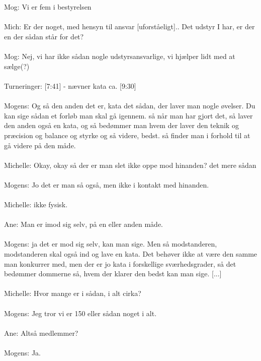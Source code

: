 \\\\
Mog: Vi er fem i bestyrelsen
\\\\
Mich: Er der noget, med hensyn til ansvar [uforståeligt].. 
Det udstyr I har, er der en der sådan står for det?
\\\\
Mog: Nej, vi har ikke sådan nogle udstyrsansvarlige, vi hjælper lidt med at sælge(?) 
\\\\
Turneringer:
[7:41] - 
nævner kata ca. [9:30]
\\\\
[9:59]
Mogens: Og så den anden det er, kata det sådan, der laver man nogle øvelser. Du kan sige sådan et forløb man skal gå igennem. så når man har gjort det, så laver den anden også en kata, og så bedømmer man hvem der laver den teknik og præcision og balance og styrke og så videre, bedst. så finder man i forhold til at gå videre på den måde.
\\\\
Michelle: Okay, okay så der er man slet ikke oppe mod hinanden? det mere sådan
\\\\
[10:29]
Mogens: Jo det er man så også, men ikke i kontakt med hinanden.
\\\\
Michelle: ikke fysisk.
\\\\
Ane: Man er imod sig selv, på en eller anden måde.
\\\\
[10:34]
Mogens: ja det er mod sig selv, kan man sige. Men så modstanderen, modstanderen skal også ind og lave en kata. Det behøver ikke at være den samme man konkurrer med, men der er jo kata i forskellige sværhedsgrader, så det bedømmer dommerne så, hvem der klarer den bedst kan man sige. [...]
\\\\
[19:42]
Michelle: Hvor mange er i sådan, i alt cirka?
\\\\
Mogens: Jeg tror vi er 150 eller sådan noget i alt. 
\\\\
Ane: Altså medlemmer?
\\\\
Mogens: Ja. 
